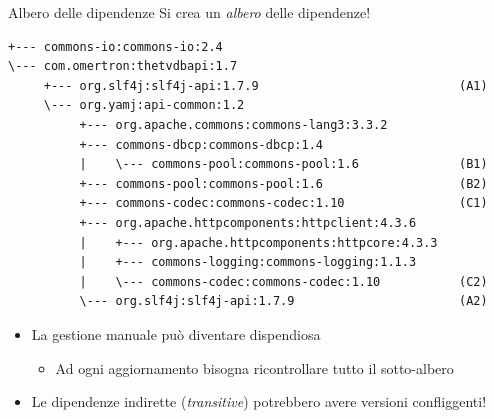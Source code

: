 \documentclass[xcolor=dvipsnames,presentation]{beamer}
\begin{document}
\begin{frame}[fragile]{Albero delle dipendenze}
    Si crea un \textit{albero} delle dipendenze!

\begin{lstlisting}[basicstyle=\tiny\ttfamily,columns=fullflexible]
+--- commons-io:commons-io:2.4
\--- com.omertron:thetvdbapi:1.7
     +--- org.slf4j:slf4j-api:1.7.9                            (A1)
     \--- org.yamj:api-common:1.2
          +--- org.apache.commons:commons-lang3:3.3.2
          +--- commons-dbcp:commons-dbcp:1.4
          |    \--- commons-pool:commons-pool:1.6              (B1)
          +--- commons-pool:commons-pool:1.6                   (B2)
          +--- commons-codec:commons-codec:1.10                (C1)
          +--- org.apache.httpcomponents:httpclient:4.3.6
          |    +--- org.apache.httpcomponents:httpcore:4.3.3
          |    +--- commons-logging:commons-logging:1.1.3
          |    \--- commons-codec:commons-codec:1.10           (C2)
          \--- org.slf4j:slf4j-api:1.7.9                       (A2)
\end{lstlisting}
    \begin{itemize}
        \item La gestione manuale può diventare dispendiosa
        \begin{itemize}
            \item Ad ogni aggiornamento bisogna ricontrollare tutto il sotto-albero
        \end{itemize}
        \item Le dipendenze indirette (\textit{transitive}) potrebbero avere versioni confliggenti!
    \end{itemize}
\end{frame}
\end{document}

